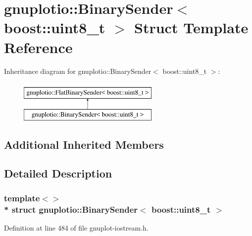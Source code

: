 \hypertarget{structgnuplotio_1_1_binary_sender_3_01boost_1_1uint8__t_01_4}{}\section{gnuplotio\+:\+:Binary\+Sender$<$ boost\+:\+:uint8\+\_\+t $>$ Struct Template Reference}
\label{structgnuplotio_1_1_binary_sender_3_01boost_1_1uint8__t_01_4}
Inheritance diagram for gnuplotio\+:\+:Binary\+Sender$<$ boost\+:\+:uint8\+\_\+t $>$\+:\begin{figure}[H]
\begin{center}
\leavevmode
\includegraphics[height=2.000000cm]{structgnuplotio_1_1_binary_sender_3_01boost_1_1uint8__t_01_4}
\end{center}
\end{figure}
\subsection*{Additional Inherited Members}


\subsection{Detailed Description}
\subsubsection*{template$<$$>$\\*
struct gnuplotio\+::\+Binary\+Sender$<$ boost\+::uint8\+\_\+t $>$}



Definition at line 484 of file gnuplot-\/iostream.\+h.

